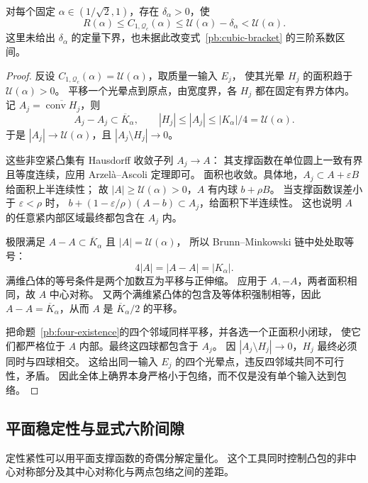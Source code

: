 \begin{theorem}[真实全体常数严格低于两点包络]\label{pb:strict-gap}
对每个固定 $\alpha\in(1/\sqrt2,1)$，存在 $\delta_\alpha>0$，使
\[
 R(\alpha)\le C_{1,\mathcal Q_c}(\alpha)
 \le\mathcal U(\alpha)-\delta_\alpha<\mathcal U(\alpha).
\]
这里未给出 $\delta_\alpha$ 的定量下界，也未据此改变式~\eqref{pb:cubic-bracket}
的三阶系数区间。
\end{theorem}
\begin{proof}
反设 $C_{1,\mathcal Q_c}(\alpha)=\mathcal U(\alpha)$，取质量一输入 $E_j$，
使其光晕 $H_j$ 的面积趋于 $\mathcal U(\alpha)>0$。
平移一个光晕点到原点，由宽度界，各 $H_j$ 都在固定有界方体内。
记 $A_j=\overline{\operatorname{conv}H_j}$，则
\[
 A_j-A_j\subset\overline K_\alpha,\qquad
 |H_j|\le|A_j|\le |K_\alpha|/4=\mathcal U(\alpha).
\]
于是 $|A_j|\to\mathcal U(\alpha)$，且 $|A_j\setminus H_j|\to0$。

这些非空紧凸集有 Hausdorff 收敛子列 $A_j\to A$：
其支撑函数在单位圆上一致有界且等度连续，应用 Arzel\`a--Ascoli 定理即可。
面积也收敛。具体地，$A_j\subset A+\varepsilon B$ 给面积上半连续性；
故 $|A|\ge\mathcal U(\alpha)>0$，$A$ 有内球 $b+\rho B$。
当支撑函数误差小于 $\varepsilon<\rho$ 时，
$b+(1-\varepsilon/\rho)(A-b)\subset A_j$，给面积下半连续性。
这也说明 $A$ 的任意紧内部区域最终都包含在 $A_j$ 内。

极限满足 $A-A\subset\overline K_\alpha$ 且 $|A|=\mathcal U(\alpha)$，
所以 Brunn--Minkowski 链中处处取等号：
\[
 4|A|=|A-A|=|K_\alpha|.
\]
满维凸体的等号条件是两个加数互为平移与正伸缩\citep[第3节]{Gardner2002}。
应用于 $A,-A$，两者面积相同，故 $A$ 中心对称。
又两个满维紧凸体的包含及等体积强制相等，因此
$A-A=\overline K_\alpha$，从而 $A$ 是 $\overline K_\alpha/2$ 的平移。

把命题~\ref{pb:four-existence}的四个邻域同样平移，并各选一个正面积小闭球，
使它们都严格位于 $A$ 内部。最终这四球都包含于 $A_j$。
因 $|A_j\setminus H_j|\to0$，$H_j$ 最终必须同时与四球相交。
这给出同一输入 $E_j$ 的四个光晕点，违反四邻域共同不可行性，矛盾。
因此全体上确界本身严格小于包络，而不仅是没有单个输入达到包络。
\end{proof}

\subsection{平面稳定性与显式六阶间隙}

定性紧性可以用平面支撑函数的奇偶分解定量化。
这个工具同时控制凸包的非中心对称部分及其中心对称化与两点包络之间的差距。

